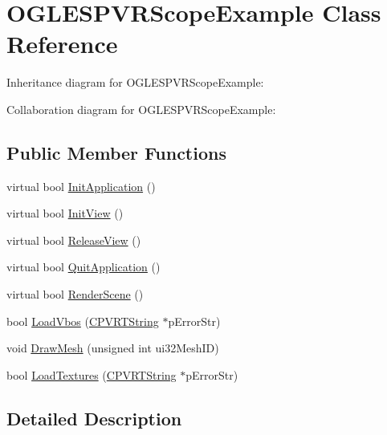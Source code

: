 \hypertarget{class_o_g_l_e_s_p_v_r_scope_example}{\section{O\+G\+L\+E\+S\+P\+V\+R\+Scope\+Example Class Reference}
\label{class_o_g_l_e_s_p_v_r_scope_example}
}


Inheritance diagram for O\+G\+L\+E\+S\+P\+V\+R\+Scope\+Example\+:


Collaboration diagram for O\+G\+L\+E\+S\+P\+V\+R\+Scope\+Example\+:
\subsection*{Public Member Functions}
\begin{DoxyCompactItemize}
\item 
virtual bool \hyperlink{class_o_g_l_e_s_p_v_r_scope_example_a2220957c59cf2eb1a8e7d303097fb3fc}{Init\+Application} ()
\item 
virtual bool \hyperlink{class_o_g_l_e_s_p_v_r_scope_example_aa6f945f457a6a30a171c800947a259df}{Init\+View} ()
\item 
virtual bool \hyperlink{class_o_g_l_e_s_p_v_r_scope_example_a20fe604792f7f23a9789ec6ecd8ddde1}{Release\+View} ()
\item 
virtual bool \hyperlink{class_o_g_l_e_s_p_v_r_scope_example_a0b40b3daf56b2a3015a9424a53d54d73}{Quit\+Application} ()
\item 
virtual bool \hyperlink{class_o_g_l_e_s_p_v_r_scope_example_a49fd8cbdfc86bf7d8c8daab7511e7377}{Render\+Scene} ()
\item 
bool \hyperlink{class_o_g_l_e_s_p_v_r_scope_example_a8e211c054b9cad3f88d05cdbff3007e3}{Load\+Vbos} (\hyperlink{class_c_p_v_r_t_string}{C\+P\+V\+R\+T\+String} $\ast$p\+Error\+Str)
\item 
void \hyperlink{class_o_g_l_e_s_p_v_r_scope_example_a9bdf8ce4ea8ee24d3f879ac79cf4f4b8}{Draw\+Mesh} (unsigned int ui32\+Mesh\+I\+D)
\item 
bool \hyperlink{class_o_g_l_e_s_p_v_r_scope_example_a4a324832f2991068a38f126d14a030ef}{Load\+Textures} (\hyperlink{class_c_p_v_r_t_string}{C\+P\+V\+R\+T\+String} $\ast$p\+Error\+Str)
\end{DoxyCompactItemize}


\subsection{Detailed Description}


